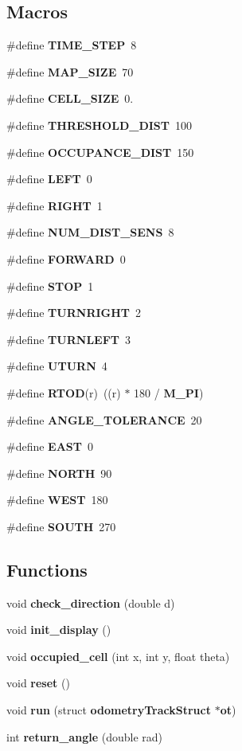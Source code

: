 \subsection*{Macros}
\begin{DoxyCompactItemize}
\item 
\#define {\bf T\-I\-M\-E\-\_\-\-S\-T\-E\-P}~8
\item 
\#define {\bf M\-A\-P\-\_\-\-S\-I\-Z\-E}~70
\item 
\#define {\bf C\-E\-L\-L\-\_\-\-S\-I\-Z\-E}~0.
\item 
\#define {\bf T\-H\-R\-E\-S\-H\-O\-L\-D\-\_\-\-D\-I\-S\-T}~100
\item 
\#define {\bf O\-C\-C\-U\-P\-A\-N\-C\-E\-\_\-\-D\-I\-S\-T}~150
\item 
\#define {\bf L\-E\-F\-T}~0
\item 
\#define {\bf R\-I\-G\-H\-T}~1
\item 
\#define {\bf N\-U\-M\-\_\-\-D\-I\-S\-T\-\_\-\-S\-E\-N\-S}~8
\item 
\#define {\bf F\-O\-R\-W\-A\-R\-D}~0
\item 
\#define {\bf S\-T\-O\-P}~1
\item 
\#define {\bf T\-U\-R\-N\-R\-I\-G\-H\-T}~2
\item 
\#define {\bf T\-U\-R\-N\-L\-E\-F\-T}~3
\item 
\#define {\bf U\-T\-U\-R\-N}~4
\item 
\#define {\bf R\-T\-O\-D}(r)~((r) $\ast$ 180 / {\bf M\-\_\-\-P\-I})
\item 
\#define {\bf A\-N\-G\-L\-E\-\_\-\-T\-O\-L\-E\-R\-A\-N\-C\-E}~20
\item 
\#define {\bf E\-A\-S\-T}~0
\item 
\#define {\bf N\-O\-R\-T\-H}~90
\item 
\#define {\bf W\-E\-S\-T}~180
\item 
\#define {\bf S\-O\-U\-T\-H}~270
\end{DoxyCompactItemize}
\subsection*{Functions}
\begin{DoxyCompactItemize}
\item 
void {\bf check\-\_\-direction} (double d)
\item 
void {\bf init\-\_\-display} ()
\item 
void {\bf occupied\-\_\-cell} (int x, int y, float theta)
\item 
void {\bf reset} ()
\item 
void {\bf run} (struct {\bf odometry\-Track\-Struct} $\ast${\bf ot})
\item 
int {\bf return\-\_\-angle} (double rad)
\end{DoxyCompactItemize}
